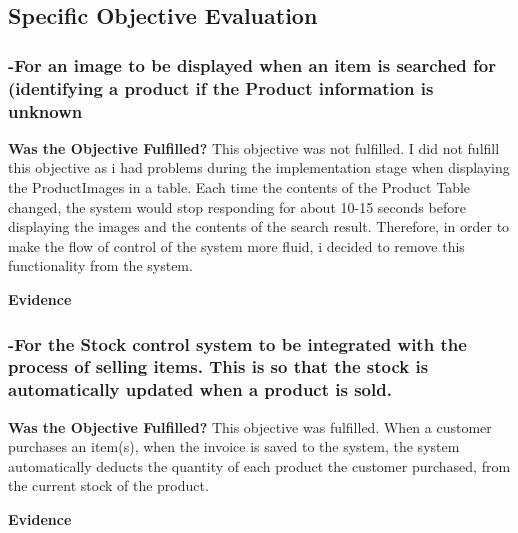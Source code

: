 \subsection{Specific Objective Evaluation}


\subsubsection{-For an image to be displayed when an item is searched for (identifying a product if the Product information is unknown}
\textbf{Was the Objective Fulfilled?} \newline
This objective was not fulfilled. I did not fulfill this objective as i had problems during the implementation stage when displaying the ProductImages in a table. Each time the contents of the Product Table changed, the system would stop responding for about 10-15 seconds before displaying the images and the contents of the search result. Therefore, in order to make the flow of control of the system more fluid, i decided to remove this functionality from the system. \newline

\textbf{Evidence} \newline





\subsubsection{-For the Stock control system to be integrated with the process of selling items. This is so that the stock is automatically updated when a product is sold.}
\label{-For the Stock control system to be integrated with the process of selling items. This is so that the stock is automatically updated when a product is sold.}
\textbf{Was the Objective Fulfilled?} \newline
This objective was fulfilled. When a customer purchases an item(s), when the invoice is saved to the system, the system automatically deducts the quantity of each product the customer purchased, from the current stock of the product.\newline

\textbf{Evidence} \newline




